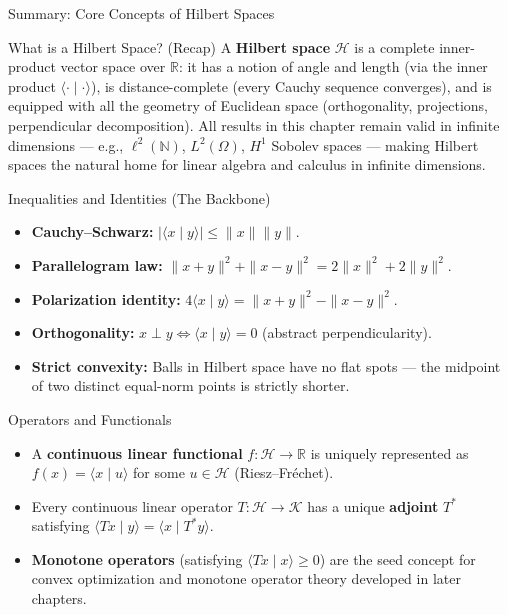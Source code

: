 \documentclass[aspectratio=169,10pt]{beamer}
\newcommand{\R}{\mathbb{R}}
\newcommand{\N}{\mathbb{N}}
\newcommand{\Hil}{\mathcal{H}}
\newcommand{\Kil}{\mathcal{K}}
\newcommand{\ip}[2]{\langle #1 \mid #2 \rangle}
\begin{document}
\begin{frame}[allowframebreaks]{Summary: Core Concepts of Hilbert Spaces}

  \begin{block}{What is a Hilbert Space? (Recap)}
    A \textbf{Hilbert space} $\Hil$ is a complete inner-product vector space
    over $\R$: it has a notion of angle and length (via the inner product
    $\ip{\cdot}{\cdot}$), is distance-complete (every Cauchy sequence
    converges), and is equipped with all the geometry of Euclidean space
    (orthogonality, projections, perpendicular decomposition). All results in
    this chapter remain valid in infinite dimensions --- e.g., $\ell^2(\N)$,
    $L^2(\Omega)$, $H^1$ Sobolev spaces --- making Hilbert spaces the natural
    home for linear algebra and calculus in infinite dimensions.
  \end{block}

  \framebreak

  \begin{block}{Inequalities and Identities (The Backbone)}
    \begin{itemize}
      \item \textbf{Cauchy--Schwarz:} $|\ip{x}{y}| \le \|x\|\|y\|$.
      \item \textbf{Parallelogram law:} $\|x+y\|^2 + \|x-y\|^2 = 2\|x\|^2 + 2\|y\|^2$.
      \item \textbf{Polarization identity:} $4\ip{x}{y} = \|x+y\|^2 - \|x-y\|^2$.
      \item \textbf{Orthogonality:} $x \perp y \iff \ip{x}{y}=0$ (abstract perpendicularity).
      \item \textbf{Strict convexity:} Balls in Hilbert space have no flat spots ---
        the midpoint of two distinct equal-norm points is strictly shorter.
    \end{itemize}
  \end{block}

  \framebreak

  \begin{block}{Operators and Functionals}
    \begin{itemize}
      \item A \textbf{continuous linear functional} $f:\Hil\to\R$ is uniquely
        represented as $f(x)=\ip{x}{u}$ for some $u\in\Hil$ (Riesz--Fr\'echet).
      \item Every continuous linear operator $T:\Hil\to\Kil$ has a unique
        \textbf{adjoint} $T^*$ satisfying $\ip{Tx}{y}=\ip{x}{T^*y}$.
      \item \textbf{Monotone operators} (satisfying $\ip{Tx}{x}\ge 0$) are
        the seed concept for convex optimization and monotone operator
        theory developed in later chapters.
    \end{itemize}
  \end{block}


\end{frame}
\end{document}
